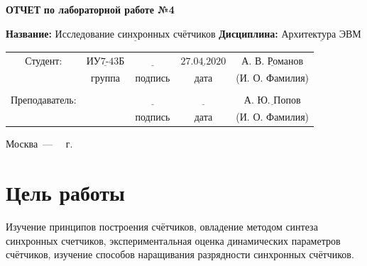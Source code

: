 \documentclass[a4paper,12pt]{article}
\begin{document}
\begin{center}
	\noindent\begin{minipage}{1.3\textwidth}\centering
	\Large\textbf{  ОТЧЕТ }\newline
	\textbf{по лабораторной работе №4}\newline\newline
	\end{minipage}
\end{center}

\noindent\textbf{Название:} $\underline{\text{Исследование синхронных счётчиков}}$\newline\newline
\noindent\textbf{Дисциплина:} $\underline{\text{Архитектура ЭВМ}}$\newline\newline\newline\newline\newline

\begin{center}
	\begin{tabular}{ccccc}
		Студент: & $\underline{\text{ИУ7-43Б}}$ & $\underline{\text{~~~~~~~~~~~}}$ & $\underline{\text{27.04.2020}}$ & $\underline{\text{А. В. Романов}}$ \\
		 & \footnotesize группа & \footnotesize подпись & \footnotesize дата  & \footnotesize (И. О. Фамилия) \\
		  &  &  &  & \\
		Преподаватель: & \textbf{} & $\underline{\text{~~~~~~~~~~~}}$ & $\underline{\text{~~~~~~~~~~~~}}$ & $\underline{\text{А. Ю. Попов}}$ \\
		&  & \footnotesize подпись & \footnotesize дата  & \footnotesize (И. О. Фамилия) \\
	\end{tabular}
\end{center}


\begin{center}
	\vfill
	Москва~---~\the\year
~г.
\end{center}
\clearpage

\section{Цель работы} Изучение принципов построения счётчиков, овладение методом синтеза синхронных счетчиков, экспериментальная оценка динамических параметров счётчиков, изучение способов наращивания разрядности синхронных счётчиков.
\end{document}
